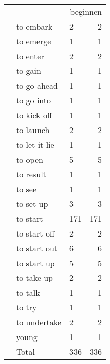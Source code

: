 {\begin{tabularx}{.45\textwidth}{lllr}
\hhline{~~--} &&  \multicolumn{2}{r}{beginnen}  \\
& to embark &  2 &  2\\
& to emerge &  1 &  1\\
& to enter &  2 &  2\\
& to gain &  1 &  1\\
& to go ahead &  1 &  1\\
& to go into &  1 &  1\\
& to kick off &  1 &  1\\
& to launch &  2 &  2\\
& to let it lie &  1 &  1\\
& to open &  5 &  5\\
& to result &  1 &  1\\
& to see &  1 &  1\\
& to set up &  3 &  3\\
& to start &  171 &  171\\
& to start off &  2 &  2\\
& to start out &  6 &  6\\
& to start up &  5 &  5\\
& to take up &  2 &  2\\
& to talk &  1 &  1\\
& to try &  1 &  1\\
& to undertake &  2 &  2\\
& young &  1 &  1\\
\midrule 
& {Total} &  336 &  336\\ 
\end{tabularx}
}
\clearpage

